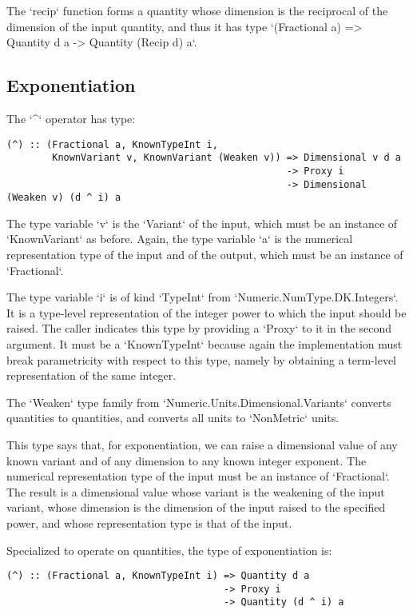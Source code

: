 \documentclass[11pt]{report}
\begin{document}
The `recip` function forms a quantity whose dimension is the reciprocal of the dimension of the input quantity, and thus it has type
`(Fractional a) => Quantity d a -> Quantity (Recip d) a`.

\subsection{Exponentiation}

The `^` operator has type:

\begin{lstlisting}
(^) :: (Fractional a, KnownTypeInt i,
        KnownVariant v, KnownVariant (Weaken v)) => Dimensional v d a
                                                 -> Proxy i
                                                 -> Dimensional (Weaken v) (d ^ i) a
\end{lstlisting}

The type variable `v` is the `Variant` of the input, which must be an instance of `KnownVariant` as before. Again, the type variable `a` is
the numerical representation type of the input and of the output, which must be an instance of `Fractional`.

The type variable `i` is of kind `TypeInt` from `Numeric.NumType.DK.Integers`. It is a type-level representation of the integer power to which
the input should be raised. The caller indicates this type by providing a `Proxy` to it in the second argument. It must be a `KnownTypeInt` because
again the implementation must break parametricity with respect to this type, namely by obtaining a term-level representation of the same integer.

The `Weaken` type family from `Numeric.Units.Dimensional.Variants` converts quantities to quantities, and converts all units to `NonMetric` units.

This type says that, for exponentiation, we can raise a dimensional value of any known variant and of any dimension to any known integer exponent.
The numerical representation type of the input must be an instance of `Fractional`. The result is a dimensional value whose variant is the weakening
of the input variant, whose dimension is the dimension of the input raised to the specified power, and whose representation type is that of the input.

Specialized to operate on quantities, the type of exponentiation is:

\begin{lstlisting}
(^) :: (Fractional a, KnownTypeInt i) => Quantity d a
                                      -> Proxy i
                                      -> Quantity (d ^ i) a
\end{lstlisting}
\end{document}
